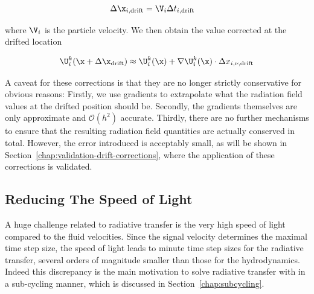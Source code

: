 \begin{align}
\Delta \x_{i,\text{drift}} &= \V_{i} \Delta t_{i,\text{drift}}
\end{align}

where $\V_i$ is the particle velocity. We then obtain the value corrected at the drifted
location

\begin{align}
\U_{i}^k (\x + \Delta \x_{\text{drift}}) \approx \U_{i}^k (\x) + \nabla \U_{i}^k (\x) \cdot \Delta
x_{i,\nu,\text{drift}}
\end{align}

A caveat for these corrections is that they are  no longer strictly conservative for obvious
reasons: Firstly, we use gradients to extrapolate what the radiation field values at the drifted
position should be. Secondly, the gradients themselves are only approximate and $\mathcal{O}(h^2)$
accurate. Thirdly, there are no further mechanisms to ensure that the resulting radiation field
quantities are actually conserved in total. However, the error introduced is acceptably small, as
will be shown in Section~\ref{chap:validation-drift-corrections}, where the application of these
corrections is validated.

















\subsection{Reducing The Speed of Light}


A huge challenge related to radiative transfer is the very high speed of light compared to the
fluid velocities. Since the signal velocity determines the maximal time step size, the speed of
light leads to minute time step sizes for the radiative transfer, several orders of magnitude
smaller than those for the hydrodynamics. Indeed this discrepancy is the main motivation to solve
radiative transfer with in a sub-cycling manner, which is discussed in
Section~\ref{chap:subcycling}.

